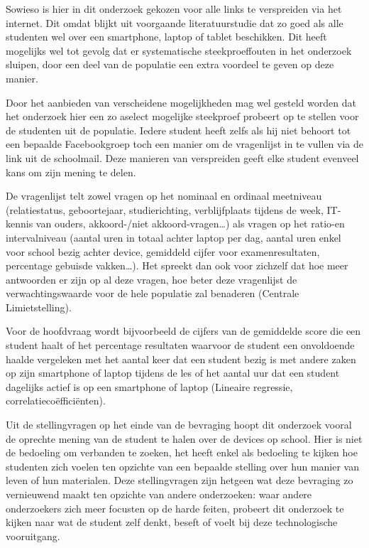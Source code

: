 Sowieso is hier in dit onderzoek gekozen voor alle links te verspreiden via het internet. Dit omdat blijkt uit voorgaande literatuurstudie dat zo goed als alle studenten wel over een smartphone, laptop of tablet beschikken. Dit heeft mogelijks wel tot gevolg dat er systematische steekproeffouten in het onderzoek sluipen, door een deel van de populatie een extra voordeel te geven op deze manier.

Door het aanbieden van verscheidene mogelijkheden mag wel gesteld worden dat het onderzoek hier een zo aselect mogelijke steekproef probeert op te stellen voor de studenten uit de populatie. Iedere student heeft zelfs als hij niet behoort tot een bepaalde Facebookgroep toch een manier om de vragenlijst in te vullen via de link uit de schoolmail. Deze manieren van verspreiden geeft elke student evenveel kans om zijn mening te delen.

De vragenlijst telt zowel vragen op het nominaal en ordinaal meetniveau (relatiestatus, geboortejaar, studierichting, verblijfplaats tijdens de week, IT-kennis van ouders, akkoord-/niet akkoord-vragen…) als vragen op het ratio-en intervalniveau (aantal uren in totaal achter laptop per dag, aantal uren enkel voor school bezig achter device, gemiddeld cijfer voor examenresultaten, percentage gebuisde vakken…). Het spreekt dan ook voor zichzelf dat hoe meer antwoorden er zijn op al deze vragen, hoe beter deze vragenlijst de verwachtingswaarde voor de hele populatie zal benaderen (Centrale Limietstelling).

Voor de hoofdvraag wordt bijvoorbeeld de cijfers van de gemiddelde score die een student haalt of het percentage resultaten waarvoor de student een onvoldoende haalde vergeleken met het aantal keer dat een student bezig is met andere zaken op zijn smartphone of laptop tijdens de les of het aantal uur dat een student dagelijks actief is op een smartphone of laptop (Lineaire regressie, correlatiecoëfficiënten).

Uit de stellingvragen op het einde van de bevraging hoopt dit onderzoek vooral de oprechte mening van de student te halen over de devices op school. Hier is niet de bedoeling om verbanden te zoeken, het heeft enkel als bedoeling te kijken hoe studenten zich voelen ten opzichte van een bepaalde stelling over hun manier van leven of hun materialen. Deze stellingvragen zijn hetgeen wat deze bevraging zo vernieuwend maakt ten opzichte van andere onderzoeken: waar andere onderzoekers zich meer focusten op de harde feiten, probeert dit onderzoek te kijken naar wat de student zelf denkt, beseft of voelt bij deze technologische vooruitgang.

